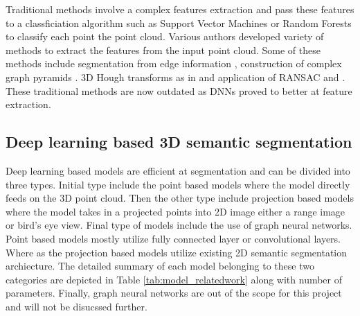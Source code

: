 Traditional methods involve a complex features extraction and pass these features to a classficiation algorithm such as Support Vector Machines or Random Forests to classify each point the point cloud.
Various authors developed variety of methods to extract the features from the input point cloud.
Some of these methods include segmentation from edge information \cite{bhanu1986range}, construction of complex graph pyramids \cite{koster}.
3D Hough transforms as in \cite{vosselman20013d} and application of RANSAC \cite{schnabel2007efficient} and \cite{tarsha2007hough}.
These traditional methods are now outdated as DNNs proved to better at feature extraction.

\subsection{Deep learning based 3D semantic segmentation}
Deep learning based models are efficient at segmentation and can be divided into three types.
Initial type include the point based models where the model directly feeds on the 3D point cloud.
Then the other type include projection based models where the model takes in a projected points into 2D image either a range image or bird's eye view.
Final type of models include the use of graph neural networks.
Point based models mostly utilize fully connected layer or convolutional layers. 
Where as the projection based models utilize existing 2D semantic segmentation archiecture.
The detailed summary of each model belonging to these two categories are depicted in Table \ref{tab:model_relatedwork} along with number of parameters.
Finally, graph neural networks are out of the scope for this project and will not be disucssed further.
